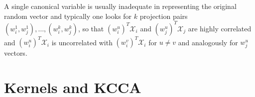 A single canonical variable is usually inadequate in representing the original random vector and typically one looks for $k$ projection pairs $(w_i^1, w_j^1),\ldots,(w_i^k, w_j^k)$, so that $(w_i^{u})^T \mathcal{X}_i$ and $(w_j^{u})^T \mathcal{X}_j$ are highly correlated and $(w_i^{u})^T \mathcal{X}_i$ is uncorrelated with $(w_i^{v})^T \mathcal{X}_i$  for $u \neq v$ and analogously for $w_j^u$ vectors.


\section{Kernels and KCCA}
